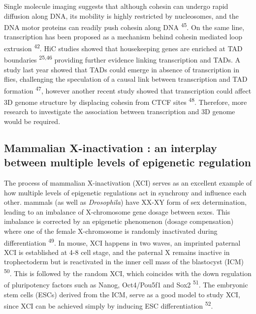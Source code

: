 \documentclass[11pt,twoside]{MPIthesis}
\theoremstyle{definition}
\theoremstyle{definition}
\theoremstyle{definition}
\theoremstyle{remark}
\begin{document}
Single molecule imaging suggests that although cohesin can undergo rapid
diffusion along DNA, its mobility is highly restricted by nucleosomes,
and the DNA motor proteins can readily push cohesin along DNA
\textsuperscript{45}. On the same line, transcription has been proposed
as a mechanism behind cohesin mediated loop extrusion
\textsuperscript{42}. HiC studies showed that housekeeping genes are
enriched at TAD boundaries \textsuperscript{25,46} providing further
evidence linking transcription and TADs. A study last year showed that
TADs could emerge in absence of transcription in flies, challenging the
speculation of a causal link between transcription and TAD formation
\textsuperscript{47}, however another recent study showed that
transcription could affect 3D genome structure by displacing cohesin
from CTCF sites \textsuperscript{48}. Therefore, more research to
investigate the association between transcription and 3D genome would be
required.

\subsection{Mammalian X-inactivation : an interplay between multiple
levels of epigenetic
regulation}\label{mammalian-x-inactivation-an-interplay-between-multiple-levels-of-epigenetic-regulation}

The process of mammalian X-inactivation (XCI) serves as an excellent
example of how multiple levels of epigenetic regulations act in
synchrony and influence each other. mammals (as well as
\emph{Drosophila}) have XX-XY form of sex determination, leading to an
imbalance of X-chromosome gene dosage between sexes. This imbalance is
corrected by an epigenetic phenomenon (dosage compensation) where one of
the female X-chromosome is randomly inactivated during differentiation
\textsuperscript{49}. In mouse, XCI happens in two waves, an imprinted
paternal XCI is established at 4-8 cell stage, and the paternal X
remains inactive in trophectoderm but is reactivated in the inner cell
mass of the blastocyst (ICM) \textsuperscript{50}. This is followed by
the random XCI, which coincides with the down regulation of pluripotency
factors such as Nanog, Oct4/Pou5f1 and Sox2 \textsuperscript{51}. The
embryonic stem cells (ESCs) derived from the ICM, serve as a good model
to study XCI, since XCI can be achieved simply by inducing ESC
differentiation \textsuperscript{52}.
\end{document}
